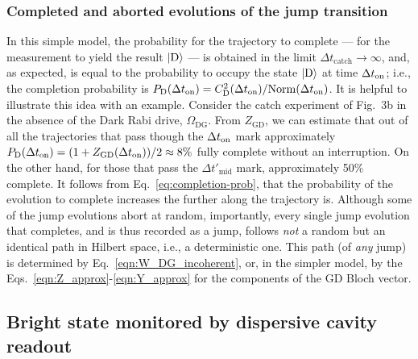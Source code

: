 \documentclass[
						superscriptaddress, 																 amsmath, amssymb,
		 aps,  prb,  
										floatfix,
		linenumbers,
			]{revtex4-1}
\begin{document}
\subsubsection{Completed and aborted evolutions of the jump transition}
 In this simple model, the probability for the trajectory to complete --- for the measurement to yield the result $|{\rm D}\rangle$ --- is obtained in the limit $\Delta t_\mathrm{catch}\rightarrow \infty$, 
 and, as expected,  is equal to the probability to occupy the state $|{\rm D}\rangle$ at time $\Delta t_{\rm on}$; i.e., the completion probability is $P_\mathrm{D}(\Delta t_{\rm on}) = C_{\rm D}^2(\Delta t_{\rm on})/{{\rm Norm}(\Delta t_{\rm on})}$.
It is helpful to illustrate this idea with an example. Consider the catch experiment of Fig.~3b in the absence of the Dark Rabi drive, $\Omega_\mathrm{DG}$. From $Z_\mathrm{GD} $, we can  estimate that out of all the trajectories that pass though the $\Delta t_{\rm on}$ mark approximately $P_\mathrm{D}(\Delta t_{\rm on})= (1+Z_\mathrm{GD}(\Delta t_{\rm on}))/2 \approx 8\%$ fully complete without an interruption. On the other hand, for those that pass the $\Delta t'_\mathrm{mid}$ mark, approximately 50\%  complete. It follows from Eq.~\eqref{eq:completion-prob}, that the  probability of the evolution to complete increases the further along the trajectory is. 
Although some of the jump evolutions abort at random, importantly, every single jump evolution that completes, and is thus recorded as a jump,  follows \textit{not} a random but an identical path in Hilbert space, i.e., a deterministic one. This path (of \textit{any}  jump) is determined   by Eq.~\eqref{eqn:W_DG_incoherent}, or, in the simpler model, by  the Eqs.~\eqref{eqn:Z_approx}-\eqref{eqn:Y_approx} for the components of the GD Bloch vector.


\subsection{Bright state monitored by dispersive cavity readout}
\label{sec:Cavity-Monitor}
\end{document}
